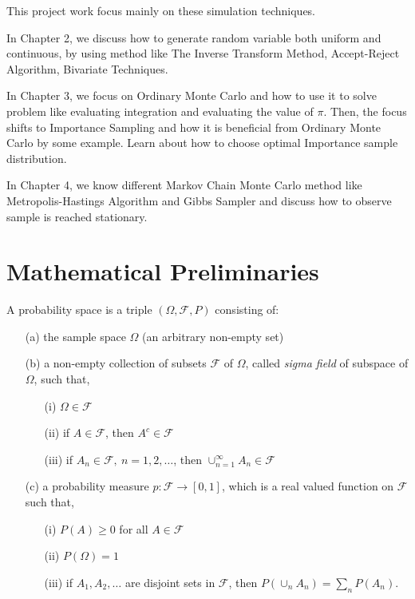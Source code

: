 This project work focus mainly on these simulation techniques.

In Chapter 2, we discuss how to generate random variable both
uniform and continuous, by using method like The Inverse Transform Method, 
Accept-Reject Algorithm, Bivariate Techniques.

In Chapter 3, we focus on Ordinary Monte Carlo and how to use it to solve problem like evaluating integration and evaluating the value of $\pi$.
Then, the focus shifts to Importance Sampling and how it is beneficial
from Ordinary Monte Carlo by some example. Learn about how to choose 
optimal Importance sample distribution.

In Chapter 4, we know different Markov Chain Monte Carlo method like Metropolis-Hastings Algorithm and Gibbs Sampler and discuss how to observe sample is reached stationary. 

\section{Mathematical Preliminaries}

\begin{definition}
	A probability space is a triple $(\Omega, \mathcal{F}, P)$ consisting of:
	\begin{enumerate}
		\item[(a)] the sample space $\Omega$ (an arbitrary non-empty set)
		\item[(b)] a non-empty collection of subsets $\mathcal{F} $ of $ \Omega $,
		      called \textit{sigma field} of subspace of $ \Omega $, 
		      such that,
		      \begin{itemize}
			      \item[(i)] $ \Omega \in \mathcal{F} $
			      \item[(ii)] if $ A \in \mathcal{F} $, then $ A^{c}\in \mathcal{F}  $
                  \item [(iii)] if $ A_n\in \mathcal{F},\ n=1,2,\ldots $, then $ \cup_{n=1}^{\infty}A_n \in \mathcal{F}  $
		      \end{itemize}
		\item [(c)] a probability measure $ p:\mathcal{F}\to [0,1] $, which is a real valued function on $ \mathcal{F} $
		      such that,
		      \begin{itemize}
			      \item [(i)] $ P(A) \ge 0 $ for all $ A\in \mathcal{F} $
			      \item [(ii)] $ P(\Omega) = 1 $
			      \item [(iii)] if $ A_1,A_2,\ldots $ are disjoint sets in $ \mathcal{F} $, then $ P(\cup_n A_n) = \sum_{n} P(A_n)  $.
		      \end{itemize}
	\end{enumerate}
\end{definition}

